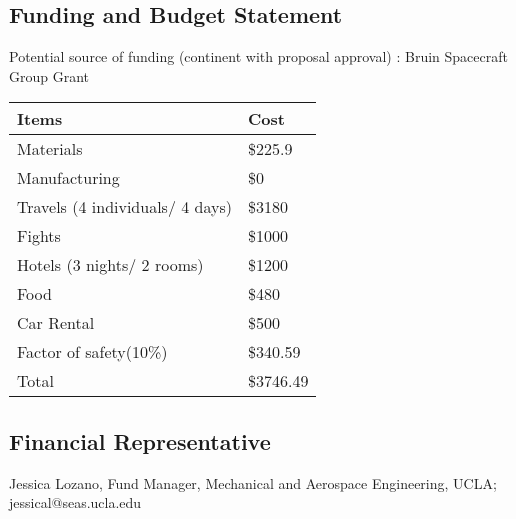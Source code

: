 \documentclass{article}
\begin{document}
\subsection{Funding and Budget Statement}
\noindent
Potential source of funding (continent with proposal approval) : Bruin Spacecraft Group Grant
\begin{center}
    \begin{tabulary}{\linewidth}{|L|L|}
    \hline
    Items       &   Cost    \\
    \hline
    Materials   &   \$225.9 \\
    \hline
    Manufacturing   &   \$0 \\
    \hline
    Travels (4 individuals/ 4 days)     & \$3180    \\
    \hline
    Fights      &   \$1000  \\
    \hline
    Hotels (3 nights/ 2 rooms)  &   \$1200  \\
    \hline
    Food        &   \$480   \\
    \hline
    Car Rental  &   \$500   \\
    \hline
    Factor of safety(10\%)  &   \$340.59    \\
    \hline
    Total       &   \$3746.49   \\
    \hline
    \end{tabulary}
\end{center}
\subsection{Financial Representative}
\noindent
Jessica Lozano, Fund Manager, Mechanical and Aerospace Engineering, UCLA; \\
jessical@seas.ucla.edu
\end{document}
